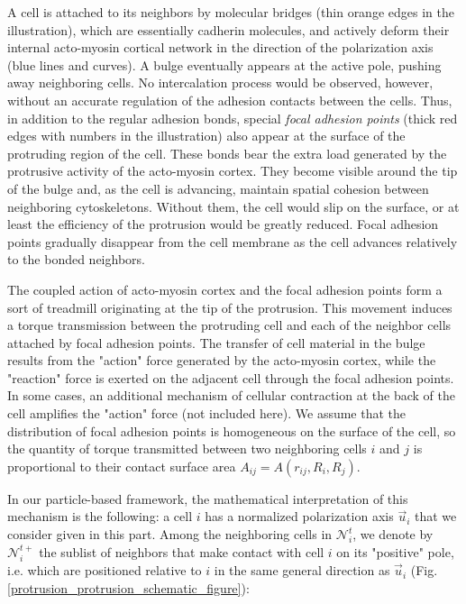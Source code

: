 A cell is attached to its neighbors by molecular bridges (thin orange edges in the illustration), which are essentially cadherin molecules, and actively deform their internal acto-myosin cortical network in the direction of the polarization axis (blue lines and curves). A bulge eventually appears at the active pole, pushing away neighboring cells. No intercalation process would be observed, however, without an accurate regulation of the adhesion contacts between the cells. Thus, in addition to the regular adhesion bonds, special \textit{focal adhesion points} (thick red edges with numbers in the illustration) also appear at the surface of the protruding region of the cell. These bonds bear the extra load generated by the protrusive activity of the acto-myosin cortex. They become visible around the tip of the bulge and, as the cell is advancing, maintain spatial cohesion between neighboring cytoskeletons. Without them, the cell would slip on the surface, or at least the efficiency of the protrusion would be greatly reduced. Focal adhesion points gradually disappear from the cell membrane as the cell advances relatively to the bonded neighbors.

The coupled action of acto-myosin cortex and the focal adhesion points form a sort of treadmill originating at the tip of the protrusion. This movement induces a torque transmission between the protruding cell and each of the neighbor cells attached by focal adhesion points. The transfer of cell material in the bulge results from the "action" force generated by the acto-myosin cortex, while the "reaction" force is exerted on the adjacent cell through the focal adhesion points. In some cases, an additional mechanism of cellular contraction at the back of the cell amplifies the "action" force (not included here). We assume that the distribution of focal adhesion points is homogeneous on the surface of the cell, so the quantity of torque transmitted between two neighboring cells $i$ and $j$ is proportional to their contact surface area $A_{ij} = A(r_{ij},R_i,R_j)$.

In our particle-based framework, the mathematical interpretation of this mechanism is the following: a cell $i$ has a normalized polarization axis $\vec{u}_i$ that we consider given in this part. Among the neighboring cells in $\mathcal{N}^t_i$, we denote by $\mathcal{N}^{t+}_i$ the sublist of neighbors that make contact with cell $i$ on its "positive" pole, i.e. which are positioned relative to $i$ in the same general direction as $\vec{u}_i$ (Fig. \ref{protrusion_protrusion_schematic_figure}):

